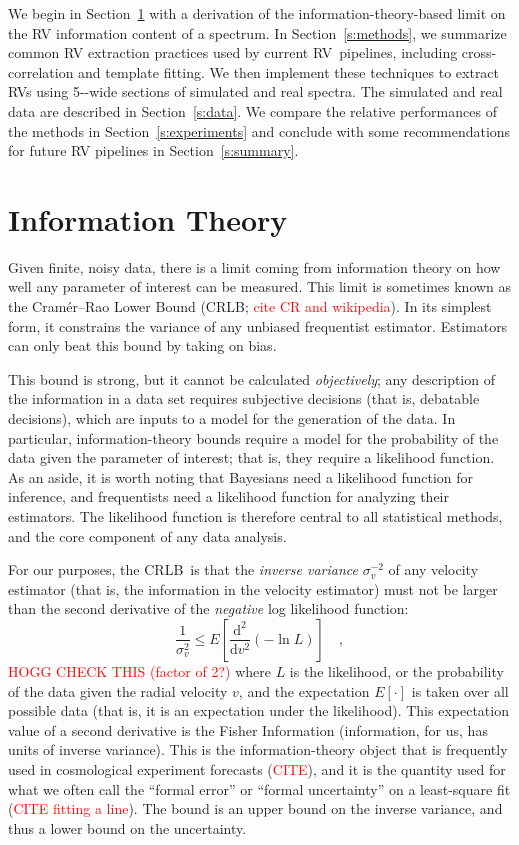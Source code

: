\documentclass[modern]{aastex63}
\newcommand{\ang}{\text{\normalfont\AA}}
\newcommand{\dd}{\mathrm{d}}
\newcommand{\sectionname}{Section}
\newcommand{\todo}[1]{\textcolor{red}{#1}}  %
\newcommand{\acronym}[1]{{\small{#1}}}
\newcommand{\RV}{\acronym{RV}}
\newcommand{\CRLB}{\acronym{CRLB}}
\begin{document}
We begin in \sectionname~\ref{s:info} with a derivation of the information-theory-based limit on the RV information content of a spectrum. 
In \sectionname~\ref{s:methods}, we summarize common RV extraction practices used by current \RV\ pipelines, including cross-correlation and template fitting. 
We then implement these techniques to extract \RV s using 5-\ang-wide sections of simulated and real spectra.
The simulated and real data are described in \sectionname~\ref{s:data}. 
We compare the relative performances of the methods in \sectionname~\ref{s:experiments} and conclude with some recommendations for future RV pipelines in \sectionname~\ref{s:summary}. 

\section{Information Theory}
\label{s:info}

Given finite, noisy data, there is a limit coming from information
theory on how well any parameter of interest can be measured.
This limit is
sometimes known as the Cram\'er--Rao Lower Bound (\CRLB; \todo{cite CR and wikipedia}).
In its simplest form, it constrains the variance of any unbiased
frequentist estimator.
Estimators can only beat this bound by taking on bias.

This bound is strong, but it cannot be calculated \emph{objectively};
any description of the information in a data set requires
subjective decisions (that is, debatable decisions), which are inputs
to a model for the generation of the data.
In particular, information-theory bounds require a model for the
probability of the data given the parameter of interest; that is, they
require a likelihood function.
As an aside, it is worth noting that
Bayesians need a likelihood function for inference, and
frequentists need a likelihood function for analyzing their estimators.
The likelihood function is therefore central to all statistical methods,
and the core component of any data analysis.

For our purposes, the \CRLB\ is that the \emph{inverse variance} $\sigma_v^{-2}$ of any velocity
estimator (that is, the information in the velocity estimator) must not be larger than the
second derivative of the \emph{negative} log likelihood function:
\begin{equation}
\frac{1}{\sigma_v^2} \leq E\left[\frac{\dd^2}{\dd v^2}(-\ln L)\right] \quad,
\end{equation}
\todo{HOGG CHECK THIS (factor of 2?)}
where $L$ is the likelihood, or the probability of the data given the radial velocity $v$,
and the expectation $E[\cdot]$ is taken over all possible data (that is, it is an
expectation under the likelihood).
This expectation value of a second derivative is the Fisher Information
(information, for us, has units of inverse variance).
This is the information-theory object that is frequently used in
cosmological experiment forecasts (\todo{CITE}),
and it is the quantity used for what we often call the ``formal error'' or
``formal uncertainty'' on a least-square fit (\todo{CITE fitting a line}).
The bound is an upper bound on the inverse variance, and thus a lower bound
on the uncertainty.
\end{document}
